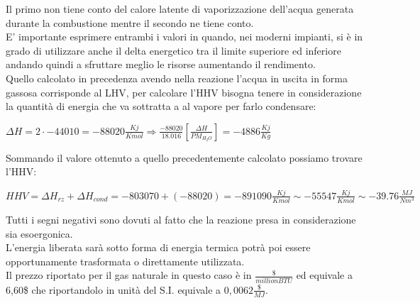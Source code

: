 \smallskip
\noindent
Il primo non tiene conto del calore latente di vaporizzazione dell'acqua generata durante la combustione mentre il secondo ne tiene conto.\\
E' importante esprimere entrambi i valori in quando, nei moderni impianti, si è in grado di utilizzare anche il delta energetico tra il limite superiore ed inferiore andando quindi a sfruttare meglio le risorse aumentando il rendimento.\\
Quello calcolato in precedenza avendo nella reazione l'acqua in uscita in forma gassosa corrisponde al LHV, per calcolare l'HHV bisogna tenere in considerazione la quantità di energia che va sottratta a al vapore per farlo condensare:
\begin{center}
    \large{$\Delta H = 2 \cdot -44010 = -88020 \frac{Kj}{Kmol} \Rightarrow \frac{-88020}{18.016}[\frac{\Delta H}{PM_{H_2O}}] = -4886 \frac{Kj}{Kg}$}
\end{center}
Sommando il valore ottenuto a quello precedentemente calcolato possiamo trovare l'HHV:
\begin{center}
    \normalsize{$HHV = \Delta H_{rz} + \Delta H_{cond} = -803070 + (-88020) = -891090 \frac{Kj}{Kmol}\sim -55547 \frac{Kj}{Kmol} \sim -39.76 \frac{MJ}{Nm^3}$}
\end{center}
Tutti i segni negativi sono dovuti al fatto che la reazione presa in considerazione sia esoergonica.\\
L'energia liberata sarà sotto forma di energia termica potrà poi essere opportunamente trasformata o direttamente utilizzata.\\
Il prezzo riportato per il gas naturale in questo caso è in $\frac{\$}{million BTU}$ ed equivale a 6,60\$ che riportandolo in unità del S.I. equivale a $0,0062\frac{\$}{MJ}$.\\
\noindent
\newpage

